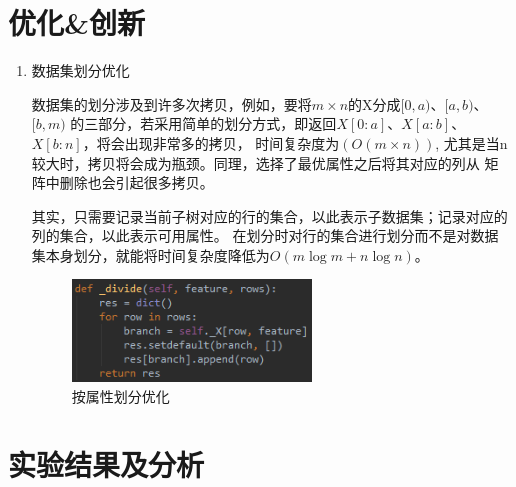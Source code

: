 \documentclass[UTF8,a4paper,12pt]{article}
\begin{document}
\section{优化\&创新}
\begin{enumerate}[itemindent=0.5em,label=\arabic*、]
  \item 数据集划分优化
  \par \qquad 数据集的划分涉及到许多次拷贝，例如，要将$m \times n$的X分成$[0, a)$、$[a, b)$、$[b, m)$
  的三部分，若采用简单的划分方式，即返回$X[0:a]$、$X[a:b]$、$X[b:n]$，将会出现非常多的拷贝，
  时间复杂度为$(O(m \times n))$, 尤其是当n较大时，拷贝将会成为瓶颈。同理，选择了最优属性之后将其对应的列从
  矩阵中删除也会引起很多拷贝。
  \par \qquad 其实，只需要记录当前子树对应的行的集合，以此表示子数据集；记录对应的列的集合，以此表示可用属性。
  在划分时对行的集合进行划分而不是对数据集本身划分，就能将时间复杂度降低为$O(m\log m + n\log n)$。

  \begin{figure}[h]
  \begin{center}
  \includegraphics[width=0.6\textwidth]{p7.png}
  \caption{按属性划分优化}
  \end{center}
  \end{figure}

\end{enumerate}
\section{实验结果及分析}
\end{document}
